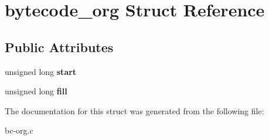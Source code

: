 \hypertarget{structbytecode__org}{\section{bytecode\-\_\-org Struct Reference}
\label{structbytecode__org}
}
\subsection*{Public Attributes}
\begin{DoxyCompactItemize}
\item 
\hypertarget{structbytecode__org_aad4edc5aafdc9ca59ce8b19806afb81d}{unsigned long {\bfseries start}}\label{structbytecode__org_aad4edc5aafdc9ca59ce8b19806afb81d}

\item 
\hypertarget{structbytecode__org_ac1418f8e99ddb98c5aa9f1b1312c3814}{unsigned long {\bfseries fill}}\label{structbytecode__org_ac1418f8e99ddb98c5aa9f1b1312c3814}

\end{DoxyCompactItemize}


The documentation for this struct was generated from the following file\-:\begin{DoxyCompactItemize}
\item 
bc-\/org.\-c\end{DoxyCompactItemize}
